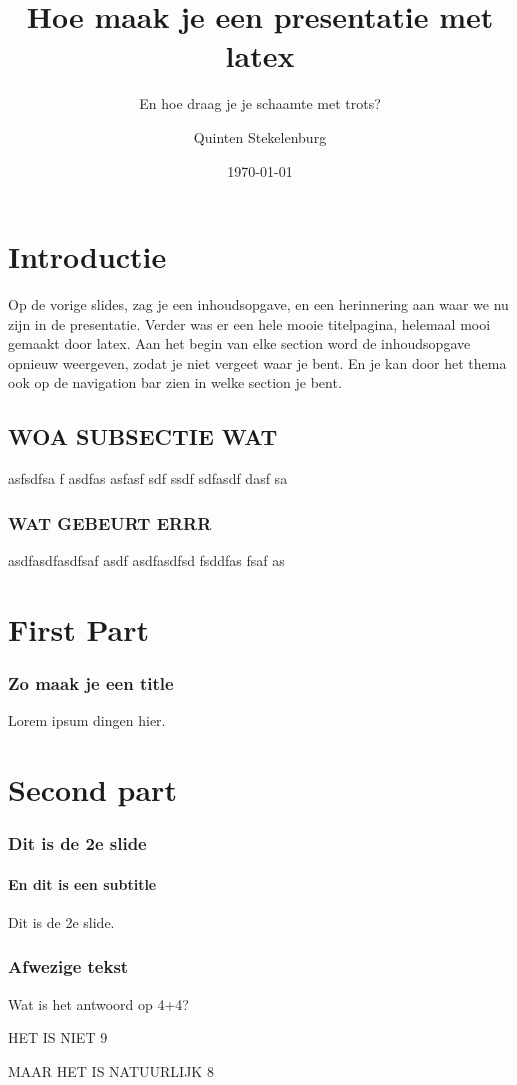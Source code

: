 \documentclass{beamer}
\title[Something]{Hoe maak je een presentatie met latex}
\subtitle{En hoe draag je je schaamte met trots?}
\institute{Hogeschool Rotterdam}
\author{Quinten Stekelenburg}
\date{\today}
\begin{document}
\frame{\titlepage}


\frame
{
	\tableofcontents
}

\section[Introductie]{Introductie}


\frame
{
Op de vorige slides, zag je een inhoudsopgave, en een herinnering aan waar we nu zijn in de presentatie. Verder was er een hele mooie titelpagina, helemaal mooi gemaakt door latex. Aan het begin van elke section word de inhoudsopgave opnieuw weergeven, zodat je niet vergeet waar je bent. En je kan door het thema ook op de navigation bar zien in welke section je bent.
\transdissolve
}

\subsection[WOA SUBSECTIE WAT]{WOA SUBSECTIE WAT}

\frame
{
asfsdfsa f asdfas asfasf sdf ssdf sdfasdf dasf sa
}

\subsubsection[WOA EEN SUBSUBSECTIE]{WAT GEBEURT ERRR}

\frame
{
asdfasdfasdfsaf asdf asdfasdfsd fsddfas fsaf as
}

\section[First Part]{First Part}

\frame
{
	\frametitle{Zo maak je een title}
	Lorem ipsum dingen hier.
}

\section[Second part]{Second part}

\frame
{
\frametitle{Dit is de 2e slide}
\framesubtitle{En dit is een subtitle}
Dit is de 2e slide.
}

\frame
{
\frametitle{Afwezige tekst}
Wat is het antwoord op 4+4?
\pause

HET IS NIET 9
\pause

MAAR HET IS NATUURLIJK 8
}

\end{document}
